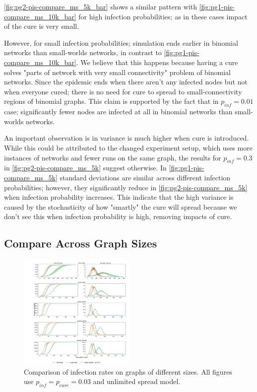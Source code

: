 \documentclass[conference]{IEEEtran}
\begin{document}
\autoref{fig:pg2-pis-compare_ms_5k_bar} shows a similar pattern with \autoref{fig:pg1-pis-compare_ms_10k_bar} for high infection probabilities; as in these cases impact of the cure is very small.

However, for small infection probabilities; simulation ends earlier in binomial networks than small-worlds networks, in contrast to \autoref{fig:pg1-pis-compare_ms_10k_bar}. We believe that this happens because having a cure solves "parts of network with very small connectivity" problem of binomial networks. Since the epidemic ends when there aren't any infected nodes but not when everyone cured; there is no need for cure to spread to small-connectivity regions of binomial graphs. This claim is supported by the fact that in $p_{inf} = 0.01$ case; significantly fewer nodes are infected at all in binomial networks than small-worlds networks.


An important observation is in variance is much higher when cure is introduced. While this could be attributed to the changed experiment setup, which uses more instances of networks and fewer runs on the same graph, the results for $p_{inf} = 0.3$ in \autoref{fig:pg2-pis-compare_ms_5k} suggest otherwise. In \autoref{fig:pg1-pis-compare_ms_5k} standard deviations are similar across different infection probabilities; however, they significantly reduce in \autoref{fig:pg2-pis-compare_ms_5k} when infection probability increases. This indicate that the high variance is caused by the stochasticity of how "smartly" the cure will spread because we don't see this when infection probability is high, removing impacts of cure.

\subsection{Compare Across Graph Sizes}


\begin{figure}[htb]
  \begin{center}
	\includegraphics[width=0.5\textwidth]{img/pg1-sizes-compare_ms_p003.pdf}
  \end{center}
	\caption{Comparison of infection rates on graphs of different sizes. All figures use $p_{inf} = p_{cure} =  0.03$ and unlimited spread model.}
	\label{fig:pg2-sizes-compare_ms_p003}
\end{figure}
\end{document}
